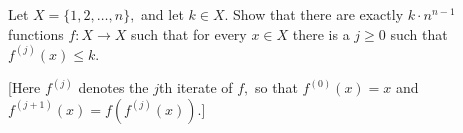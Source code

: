 Let $X=\{1,2,\dots,n\},$ and let $k\in X.$ Show that there are exactly $k\cdot n^{n-1}$ functions $f:X\to X$ such that for every $x\in X$ there is a $j\ge 0$ such that $f^{(j)}(x)\le k.$

[Here $f^{(j)}$ denotes the $j$th iterate of $f,$ so that $f^{(0)}(x)=x$ and $f^{(j+1)}(x)=f\left(f^{(j)}(x)\right).$]